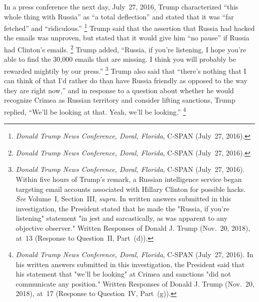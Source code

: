 In a press conference the next day, July~27, 2016, Trump characterized ``this whole thing with Russia'' as ``a total deflection'' and stated that it was ``far fetched'' and ``ridiculous.''%
\footnote{\textit{Donald Trump News Conference, Doral, Florida}, C-SPAN (July~27, 2016).}
Trump said that the assertion that Russia had hacked the emails was unproven, but stated that it would give him ``no pause'' if Russia had Clinton's emails.%
\footnote{\textit{Donald Trump News Conference, Doral, Florida}, C-SPAN (July~27, 2016).}
Trump added, ``Russia, if you're listening, I hope you're able to find the 30,000 emails that are missing. I think you will probably be rewarded mightily by our press.''%
\footnote{\textit{Donald Trump News Conference, Doral, Florida}, C-SPAN (July~27, 2016).
Within five hours of Trump's remark, a Russian intelligence service began targeting email accounts associated with Hillary Clinton for possible hacks.
\textit{See} Volume~I, Section~III, \textit{supra}.
In written answers submitted in this investigation, the President stated that he made the "Russia, if you're listening" statement "in jest and sarcastically, as was apparent to any objective observer."
Written Responses of Donald J. Trump (Nov.~20, 2018), at~13 (Response to Question~II, Part~(d)).}
Trump also said that ``there's nothing that I can think of that I'd rather do than have Russia friendly as opposed to the way they are right now,'' and in response to a question about whether he would recognize Crimea as Russian territory and consider lifting sanctions, Trump replied, ``We'll be looking at that. Yeah, we'll be looking.''%
\footnote{\textit{Donald Trump News Conference, Doral, Florida}, C-SPAN (July~27, 2016).
In his written answers submitted in this investigation, the President said that his statement that "we'll be looking" at Crimea and sanctions "did not communicate any position."
Written Responses of Donald J. Trump (Nov.~20, 2018), at~17 (Response to Question~IV, Part~(g)).}

